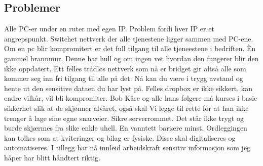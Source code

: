 \documentclass[12pt,a4paper,norsk]{article}
\begin{document}
\subsection*{Problemer}
Alle PC-er under en ruter med egen IP. Problem fordi hver IP er et angrepspunkt. Switchet nettverk der alle tjenestene ligger sammen med PC-ene. Om en pc blir kompromitert er det full tilgang til alle tjeneestene i bedriften.
Èn gammel brannmur. Denne har hull og om ingen vet hvordan den fungerer blir den ikke oppdatert. Ett felles trådløs nettverk som nå er bridget gir altså alle som kommer seg inn fri tilgang til alle på det. Nå kan du være i trygg avstand og hente ut den sensitive dataen du har lyst på. Felles dropbox er ikke sikkert, kan endre vilkår, vil bli kompromiter.
Bob Kåre og alle hans følgere må kurses i basic sikkerhet slik at de skjønner alvåret, også skal Vi legge til rette for at han ikke trenger å lage sine egne snarveier. Sikre serverrommet. Det står ikke trygt og burde skjærmes fra slike enkle uhell. En vanntett bariære minst. Ordleggingen kan tolkes som at kviteringer og bilag er fysiske. Disse skal digitaliseres og automatiseres. I tillegg har nå innleid arbeidskraft sensitiv informasjon som jeg håper har blitt håndtert riktig.
\end{document}

